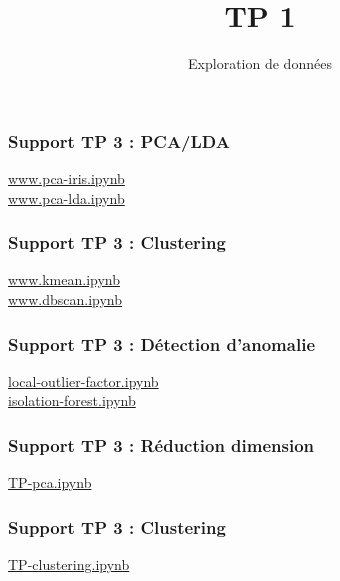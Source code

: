 \documentclass{formation}
\title{TP 1}
\subtitle{Exploration de données}
\begin{document}
\maketitle
    
    
\begin{frame}
  \frametitle{Support TP 3 : PCA/LDA}
  \begin{center}
    \href{https://colab.research.google.com/drive/1n_97rd-P5Vo96QG5gFmbqqG1gRcxsehT}{www.pca-iris.ipynb}\\
    \href{https://colab.research.google.com/drive/1ctaJCxSC-V94vJMJHsYsfoFag0sKQKiy}{www.pca-lda.ipynb}
  \end{center}
\end{frame}

\begin{frame}
  \frametitle{Support TP 3 : Clustering}
  \begin{center}
    \href{https://colab.research.google.com/drive/1-WLPr0rs_h2lf7kvUYJnGAEmwrt86rnE}{www.kmean.ipynb}\\
    \href{https://colab.research.google.com/drive/1ENdoGQdU5nHo6_2O6Ip9Qz3hAlsfW3c4}{www.dbscan.ipynb}
  \end{center}
\end{frame}

\begin{frame}
  \frametitle{Support TP 3 : Détection d'anomalie}
  \begin{center}
    \href{https://colab.research.google.com/drive/1-nbjcb5JCVDyDDK6DFsVpfBEKcD34X_C}{local-outlier-factor.ipynb}\\
    \href{https://colab.research.google.com/drive/1EsUmo2brFdXJ1I2WVEopt3fK2y1jTYE2}{isolation-forest.ipynb}
  \end{center}
\end{frame}

\begin{frame}
  \frametitle{Support TP 3 : Réduction dimension}
  \begin{center}
    \href{https://colab.research.google.com/drive/1IidWHFuR3V0jY47UqY_Xl9qB-eBZ3jj6}{TP-pca.ipynb}
  \end{center}
\end{frame}

\begin{frame}
  \frametitle{Support TP 3 : Clustering}
  \begin{center}
    \href{https://colab.research.google.com/drive/1lhwD8OXXvqy_8wOVE6P12uPuLTA0DABS}{TP-clustering.ipynb}
  \end{center}
\end{frame}
\end{document}
